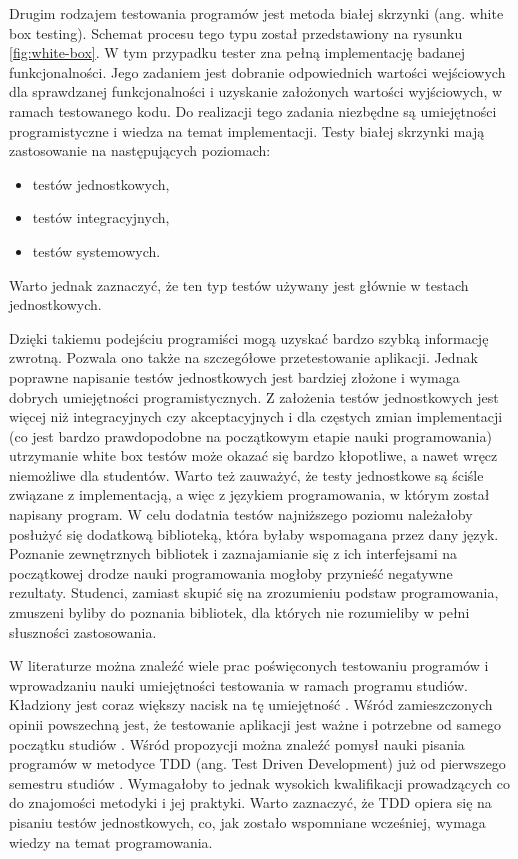Drugim rodzajem testowania programów jest metoda białej skrzynki (ang. white box testing).
Schemat procesu tego typu został przedstawiony na rysunku \ref{fig:white-box}.
W tym przypadku tester zna pełną implementację badanej funkcjonalności.
Jego zadaniem jest dobranie odpowiednich wartości wejściowych dla sprawdzanej funkcjonalności i uzyskanie założonych wartości wyjściowych, w ramach testowanego kodu.
Do realizacji tego zadania niezbędne są umiejętności programistyczne i wiedza na temat implementacji.
Testy białej skrzynki mają zastosowanie na następujących poziomach:
\begin{itemize}
\item testów jednostkowych,
\item testów integracyjnych,
\item testów systemowych.
\end{itemize}
Warto jednak zaznaczyć, że ten typ testów używany jest głównie w testach jednostkowych.

Dzięki takiemu podejściu programiści mogą uzyskać bardzo szybką informację zwrotną.
Pozwala ono także na szczegółowe przetestowanie aplikacji.
Jednak poprawne napisanie testów jednostkowych jest bardziej złożone i wymaga dobrych umiejętności programistycznych.
Z założenia testów jednostkowych jest więcej niż integracyjnych czy akceptacyjnych i dla częstych zmian implementacji (co jest bardzo prawdopodobne na początkowym etapie nauki programowania) utrzymanie white box testów może okazać się bardzo kłopotliwe, a nawet wręcz niemożliwe dla studentów.
Warto też zauważyć, że testy jednostkowe są ściśle związane z implementacją, a więc z językiem programowania, w którym został napisany program.
W celu dodatnia testów najniższego poziomu należałoby posłużyć się dodatkową biblioteką, która byłaby wspomagana przez dany język.
Poznanie zewnętrznych bibliotek i zaznajamianie się z ich interfejsami na początkowej drodze nauki programowania mogłoby przynieść negatywne rezultaty.
Studenci, zamiast skupić się na zrozumieniu podstaw programowania, zmuszeni byliby do poznania bibliotek, dla których nie rozumieliby w pełni słuszności zastosowania.

W literaturze można znaleźć wiele prac poświęconych testowaniu programów i wprowadzaniu nauki umiejętności testowania w ramach programu studiów.
Kładziony jest coraz większy nacisk na tę umiejętność \cite{tests-important}.
Wśród zamieszczonych opinii powszechną jest, że testowanie aplikacji jest ważne i potrzebne od samego początku studiów \cite{test-from-scratch}.
Wśród propozycji można znaleźć pomysł nauki pisania programów w metodyce TDD (ang. Test Driven Development) już od pierwszego semestru studiów \cite{tdd-on-start}.
Wymagałoby to jednak wysokich kwalifikacji prowadzących co do znajomości metodyki i jej praktyki.
Warto zaznaczyć, że TDD opiera się na pisaniu testów jednostkowych, co, jak zostało wspomniane wcześniej, wymaga wiedzy na temat programowania.

